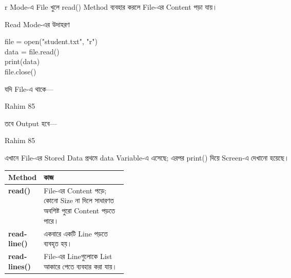 \textenglish{\ttfamily r} Mode-এ File খুলে
\textenglish{\ttfamily read()} Method ব্যবহার করলে File-এর Content
পড়া যায়।

\begin{codeoutputbox}{Read Mode-এর উদাহরণ}
\noindent
\begin{minipage}[t]{0.54\linewidth}
\vspace{0pt}
\codeheading
\begin{english}
\ttfamily
file = open("student.txt", "r")\\
data = file.read()\\
print(data)\\
file.close()
\end{english}
\end{minipage}
\hfill
\begin{minipage}[t]{0.42\linewidth}
\vspace{0pt}
\outputheading

যদি File-এ থাকে—

\begin{center}
\textenglish{\ttfamily Rahim 85}
\end{center}

তবে Output হবে—

\begin{center}
\textenglish{\ttfamily Rahim 85}
\end{center}
\end{minipage}
\end{codeoutputbox}

এখানে File-এর Stored Data প্রথমে
\textenglish{\ttfamily data} Variable-এ এসেছে; এরপর
\textenglish{\ttfamily print()} দিয়ে Screen-এ দেখানো হয়েছে।



\begin{tabularx}{\linewidth}{|>{\bfseries\RaggedRight\arraybackslash}p{0.27\linewidth}|Y|}
\hline
{}
\textbf{Method} & \textbf{কাজ}\\
\hline
\textenglish{\ttfamily read()} & File-এর Content পড়ে; কোনো Size না দিলে সাধারণত অবশিষ্ট পুরো Content পড়তে পারে।\\
\hline
\textenglish{\ttfamily readline()} & একবারে একটি Line পড়তে ব্যবহৃত হয়।\\
\hline
\textenglish{\ttfamily readlines()} & File-এর Lineগুলোকে List আকারে পেতে ব্যবহার করা যায়।\\
\hline
\end{tabularx}

